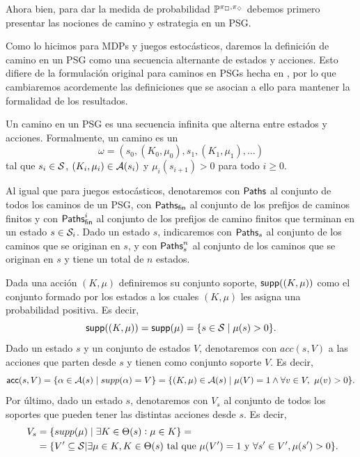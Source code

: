 Ahora bien, para dar la medida de probabilidad $\mathbb{P}^{\pi_\square, \pi_\diamondsuit}$
debemos primero presentar las nociones de camino y estrategia en un PSG.

Como lo hicimos para MDPs y juegos estocásticos, daremos la definición de
camino en un PSG como una secuencia alternante de estados y acciones. Esto
difiere de la formulación original para caminos en PSGs hecha en
\cite{Polytopal}, por lo que cambiaremos acordemente las definiciones que se
asocian a ello para mantener la formalidad de los resultados.

\begin{definition}
	Un camino en un PSG es una secuencia infinita que alterna entre estados y acciones. Formalmente, un camino es un $$\omega = (s_0, (K_0, \mu_0), s_1, (K_1, \mu_1), \dots)$$ tal que $s_i \in \mathcal{S}$, $(K_i, \mu_i) \in \mathcal{A}(s_i)$ y $\mu_i(s_{i+1}) > 0$ para todo $i \geq 0$.

	Al igual que para juegos estocásticos, denotaremos con $\textsf{Paths}$ al conjunto de
	todos los caminos de un PSG, con $\textsf{Paths}_\textsf{fin}$ al conjunto de los prefijos de
	caminos finitos y con $\textsf{Paths}_\textsf{fin}^i$ al conjunto de los prefijos de camino
	finitos que terminan en un estado $s \in \mathcal{S}_i$. Dado un estado $s$,
	indicaremos con $\textsf{Paths}_s$ al conjunto de los caminos que se originan en $s$, y
	con $\textsf{Paths}_s^n$ al conjunto de los caminos que se originan en $s$ y tiene un
	total de $n$ estados.
\end{definition}

\begin{definition}
	Dada una acción $(K, \mu)$ definiremos su conjunto soporte, $\textsf{supp}((K, \mu))$ como el conjunto formado por los estados a los cuales $(K, \mu)$ les asigna una probabilidad positiva. Es decir,
	$$\textsf{supp}((K, \mu)) = \textsf{supp}(\mu) = \{s \in \mathcal{S} \mid \mu(s) > 0\}.$$
	Dado un estado $s$ y un conjunto de estados $V$, denotaremos con $acc(s, V)$ a
	las acciones que parten desde $s$ y tienen como conjunto soporte $V$. Es decir,
	$$\textsf{acc}(s, V) = \{\alpha \in \mathcal{A}(s) \mid supp(\alpha) = V\} = \{(K, \mu) \in \mathcal{A}(s) \mid \mu(V) = 1 \wedge \forall v \in V, \ \mu(v) > 0\}.$$
	Por último, dado un estado $s$, denotaremos con $V_s$ al conjunto de todos los
	soportes que pueden tener las distintas acciones desde $s$. Es decir,
	\begin{align*}~\label{definicionVs}
		V_s &= \{supp(\mu) \mid \exists K \in \Theta(s): \mu \in K\} = \\
		&= \{V' \subseteq \mathcal{S} | \exists \mu \in K, K \in \Theta(s) \text{ tal que } \mu(V') = 1 \text{ y } \forall s' \in V', \mu(s') > 0\}.
	\end{align*}
\end{definition}

